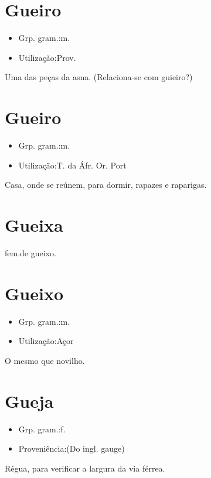 \section{Gueiro}
\begin{itemize}
\item {Grp. gram.:m.}
\end{itemize}
\begin{itemize}
\item {Utilização:Prov.}
\end{itemize}
Uma das peças da asna.
(Relaciona-se com \textunderscore guieiro\textunderscore ?)
\section{Gueiro}
\begin{itemize}
\item {Grp. gram.:m.}
\end{itemize}
\begin{itemize}
\item {Utilização:T. da Áfr. Or. Port}
\end{itemize}
Casa, onde se reúnem, para dormir, rapazes e raparigas.
\section{Gueixa}
\textunderscore fem.\textunderscore  de \textunderscore gueixo\textunderscore .
\section{Gueixo}
\begin{itemize}
\item {Grp. gram.:m.}
\end{itemize}
\begin{itemize}
\item {Utilização:Açor}
\end{itemize}
O mesmo que \textunderscore novilho\textunderscore .
\section{Gueja}
\begin{itemize}
\item {Grp. gram.:f.}
\end{itemize}
\begin{itemize}
\item {Proveniência:(Do ingl. \textunderscore gauge\textunderscore )}
\end{itemize}
Régua, para verificar a largura da via férrea.
